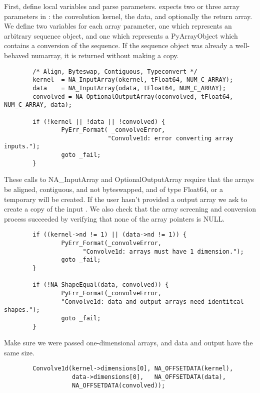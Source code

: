 First, define local variables and parse parameters.  
expects two or three array parameters in : the convolution kernel,
the data, and optionally the return array.  We define two variables for each
array parameter, one which represents an arbitrary sequence object, and one
which represents a PyArrayObject which contains a conversion of the sequence.
If the sequence object was already a well-behaved numarray, it is returned
without making a copy.

\begin{verbatim}
        /* Align, Byteswap, Contiguous, Typeconvert */
        kernel  = NA_InputArray(okernel, tFloat64, NUM_C_ARRAY);
        data    = NA_InputArray(odata, tFloat64, NUM_C_ARRAY);
        convolved = NA_OptionalOutputArray(oconvolved, tFloat64, NUM_C_ARRAY, data);

        if (!kernel || !data || !convolved) {
                PyErr_Format( _convolveError, 
                             "Convolve1d: error converting array inputs.");
                goto _fail;
        }
\end{verbatim}

These calls to NA_InputArray and OptionalOutputArray require that the arrays be
aligned, contiguous, and not byteswapped, and of type Float64, or a temporary
will be created.  If the user hasn't provided a output array we ask
 to create a copy of the input .
We also check that the array screening and conversion process succeeded by
verifying that none of the array pointers is NULL.

\begin{verbatim}
        if ((kernel->nd != 1) || (data->nd != 1)) {
                PyErr_Format(_convolveError,
                      "Convolve1d: arrays must have 1 dimension.");
                goto _fail;
        }

        if (!NA_ShapeEqual(data, convolved)) {
                PyErr_Format(_convolveError,
                "Convolve1d: data and output arrays need identitcal shapes.");
                goto _fail;
        }
\end{verbatim}

Make sure we were passed one-dimensional arrays, and data and output have the
same size.

\begin{verbatim}
        Convolve1d(kernel->dimensions[0], NA_OFFSETDATA(kernel),
                   data->dimensions[0],   NA_OFFSETDATA(data),
                   NA_OFFSETDATA(convolved));
\end{verbatim}

